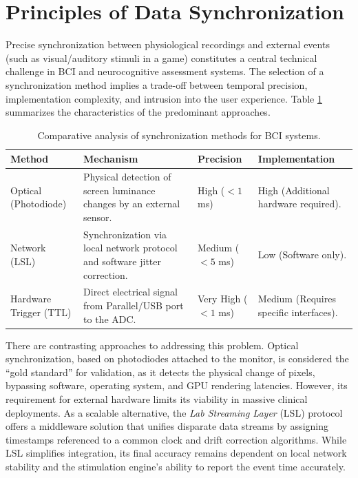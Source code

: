 \section{Principles of Data Synchronization}
\label{sec:sync_principles}

Precise synchronization between physiological recordings and external events (such as visual/auditory stimuli in a game) constitutes a central technical challenge in BCI and neurocognitive assessment systems. The selection of a synchronization method implies a trade-off between temporal precision, implementation complexity, and intrusion into the user experience. Table \ref{tab:sync_methods} summarizes the characteristics of the predominant approaches.

\begin{table}[ht]
    \centering
    \caption{Comparative analysis of synchronization methods for BCI systems.}
    \label{tab:sync_methods}
    \begin{tabular}{p{3cm} p{5cm} p{2.5cm} p{3.5cm}}
        \toprule
        \textbf{Method}        & \textbf{Mechanism}                                                         & \textbf{Precision}  & \textbf{Implementation}                \\
        \midrule
        Optical (Photodiode)   & Physical detection of screen luminance changes by an external sensor.      & High ($<1$ ms)      & High (Additional hardware required).   \\
        Network (LSL)          & Synchronization via local network protocol and software jitter correction. & Medium ($<5$ ms)    & Low (Software only).                   \\
        Hardware Trigger (TTL) & Direct electrical signal from Parallel/USB port to the ADC.                & Very High ($<1$ ms) & Medium (Requires specific interfaces). \\
        \bottomrule
    \end{tabular}
\end{table}

There are contrasting approaches to addressing this problem. Optical synchronization, based on photodiodes attached to the monitor, is considered the ``gold standard'' for validation, as it detects the physical change of pixels, bypassing software, operating system, and GPU rendering latencies. However, its requirement for external hardware limits its viability in massive clinical deployments. As a scalable alternative, the \textit{Lab Streaming Layer} (LSL) protocol offers a middleware solution that unifies disparate data streams by assigning timestamps referenced to a common clock and drift correction algorithms. While LSL simplifies integration, its final accuracy remains dependent on local network stability and the stimulation engine's ability to report the event time accurately.

